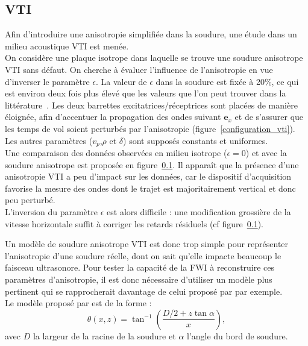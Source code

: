 \subsection{VTI}
Afin d'introduire une anisotropie simplifiée dans la soudure, une étude dans un milieu acoustique VTI est menée.\\

On considère une plaque isotrope dans laquelle se trouve une soudure anisotrope VTI sans défaut. On cherche à évaluer l'influence de l'anisotropie en vue d'inverser le paramètre $\epsilon$. La valeur de $\epsilon$ dans la soudure est fixée à 20\%, ce qui est environ deux fois plus élevé que les valeurs que l'on peut trouver dans la littérature~\citep{chassignole}. Les deux barrettes excitatrices/réceptrices sont placées de manière éloignée, afin d'accentuer la propagation des ondes suivant $\bm{e}_{x}$ et de s'assurer que les temps de vol soient perturbés par l'anisotropie (figure~\ref{configuration_vti}).\\
Les autres paramètres ($v_{p}$,$\rho$ et $\delta$) sont supposés constants et uniformes.\\

Une comparaison des données observées en milieu isotrope ($\epsilon = 0$) et avec la soudure anisotrope est proposée en figure~\ref{}. Il apparaît que la présence d'une anisotropie VTI a peu d'impact sur les données, car le dispositif d'acquisition favorise la mesure des ondes dont le trajet est majoritairement vertical et donc peu perturbé.\\
 L'inversion du paramètre $\epsilon$ est alors difficile : une modification grossière de la vitesse horizontale suffit à corriger les retards résiduels (cf figure~\ref{}).
 
 
Un modèle de soudure anisotrope VTI est donc trop simple pour représenter l'anisotropie d'une soudure réelle, dont on sait qu'elle impacte beaucoup le faisceau ultrasonore. Pour tester la capacité de la FWI à reconstruire ces paramètres d'anisotropie, il est donc nécessaire d'utiliser un modèle plus pertinent qui se rapprocherait davantage de celui proposé par \cite{ogilvy} par exemple.\\

Le modèle proposé par \cite{ogilvy} est de la forme : 
\begin{equation}
	\theta(x,z) = \tan^{-1}\left( \frac{D/2 + z\tan\alpha}{x} \right),
\end{equation}
avec $D$ la largeur de la racine de la soudure et $\alpha$  l'angle du bord de soudure.

